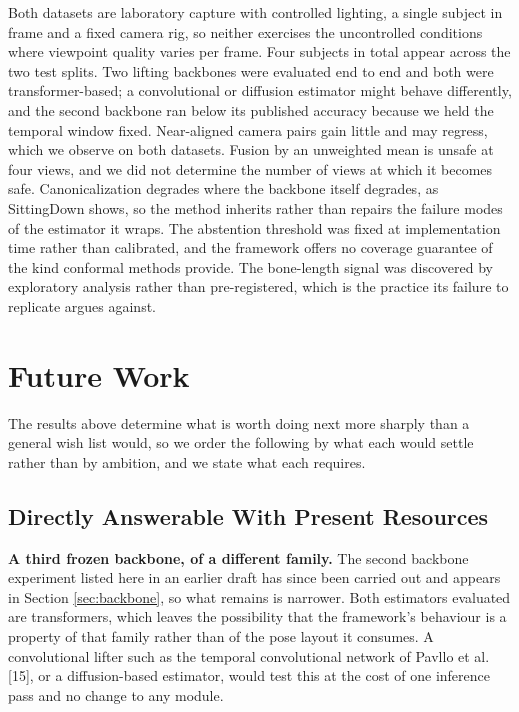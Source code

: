 \documentclass[12pt,a4paper]{report}
\begin{document}
Both datasets are laboratory capture with controlled lighting, a single subject in frame and a fixed camera rig, so neither exercises the uncontrolled conditions where viewpoint quality varies per frame. Four subjects in total appear across the two test splits. Two lifting backbones were evaluated end to end and both were transformer-based; a convolutional or diffusion estimator might behave differently, and the second backbone ran below its published accuracy because we held the temporal window fixed. Near-aligned camera pairs gain little and may regress, which we observe on both datasets. Fusion by an unweighted mean is unsafe at four views, and we did not determine the number of views at which it becomes safe. Canonicalization degrades where the backbone itself degrades, as SittingDown shows, so the method inherits rather than repairs the failure modes of the estimator it wraps. The abstention threshold was fixed at implementation time rather than calibrated, and the framework offers no coverage guarantee of the kind conformal methods provide. The bone-length signal was discovered by exploratory analysis rather than pre-registered, which is the practice its failure to replicate argues against.

\section*{Future Work}
\label{sec:future}

The results above determine what is worth doing next more sharply than a general wish list would, so we order the following by what each would settle rather than by ambition, and we state what each requires.

\subsection*{Directly Answerable With Present Resources}

\noindent \textbf{A third frozen backbone, of a different family.} The second backbone experiment listed here in an earlier draft has since been carried out and appears in Section \ref{sec:backbone}, so what remains is narrower. Both estimators evaluated are transformers, which leaves the possibility that the framework's behaviour is a property of that family rather than of the pose layout it consumes. A convolutional lifter such as the temporal convolutional network of Pavllo et al. [15], or a diffusion-based estimator, would test this at the cost of one inference pass and no change to any module.
\end{document}
